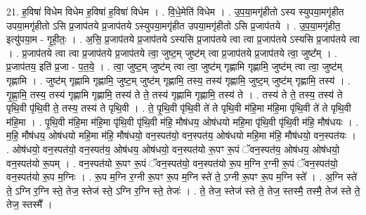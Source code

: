 \documentclass[17pt]{extarticle}
\begin{document}
21. ह॒विषा॑ विधेम विधेम ह॒विषा॑ ह॒विषा॑ विधेम । . वि॒धे॒मेति॑ विधेम । . उ॒प॒या॒मगृ॑हीतो ऽस्य स्युपया॒मगृ॑हीत उपया॒मगृ॑हीतो ऽसि प्र॒जाप॑तये प्र॒जाप॑तये ऽस्युपया॒मगृ॑हीत उपया॒मगृ॑हीतो ऽसि प्र॒जाप॑तये । . उ॒प॒या॒मगृ॑हीत॒ इत्यु॑पया॒म - गृ॒ही॒तः॒ । . अ॒सि॒ प्र॒जाप॑तये प्र॒जाप॑तये ऽस्यसि प्र॒जाप॑तये त्वा त्वा प्र॒जाप॑तये ऽस्यसि प्र॒जाप॑तये त्वा । . प्र॒जाप॑तये त्वा त्वा प्र॒जाप॑तये प्र॒जाप॑तये त्वा॒ जुष्ट॒म् जुष्ट॑म् त्वा प्र॒जाप॑तये प्र॒जाप॑तये त्वा॒ जुष्ट᳚म् । . प्र॒जाप॑तय॒ इति॑ प्र॒जा - प॒त॒ये॒ । . त्वा॒ जुष्ट॒म् जुष्ट॑म् त्वा त्वा॒ जुष्ट॑म् गृह्णामि गृह्णामि॒ जुष्ट॑म् त्वा त्वा॒ जुष्ट॑म् गृह्णामि । . जुष्ट॑म् गृह्णामि गृह्णामि॒ जुष्ट॒म् जुष्ट॑म् गृह्णामि॒ तस्य॒ तस्य॑ गृह्णामि॒ जुष्ट॒म् जुष्ट॑म् गृह्णामि॒ तस्य॑ । . गृ॒ह्णा॒मि॒ तस्य॒ तस्य॑ गृह्णामि गृह्णामि॒ तस्य॑ ते ते॒ तस्य॑ गृह्णामि गृह्णामि॒ तस्य॑ ते । . तस्य॑ ते ते॒ तस्य॒ तस्य॑ ते पृथि॒वी पृ॑थि॒वी ते॒ तस्य॒ तस्य॑ ते पृथि॒वी । . ते॒ पृ॒थि॒वी पृ॑थि॒वी ते॑ ते पृथि॒वी म॑हि॒मा म॑हि॒मा पृ॑थि॒वी ते॑ ते पृथि॒वी म॑हि॒मा । . पृ॒थि॒वी म॑हि॒मा म॑हि॒मा पृ॑थि॒वी पृ॑थि॒वी म॑हि॒ मौष॑धय॒ ओष॑धयो महि॒मा पृ॑थि॒वी पृ॑थि॒वी म॑हि॒ मौष॑धयः । . म॒हि॒ मौष॑धय॒ ओष॑धयो महि॒मा म॑हि॒ मौष॑धयो॒ वन॒स्पत॑यो॒ वन॒स्पत॑य॒ ओष॑धयो महि॒मा म॑हि॒ मौष॑धयो॒ वन॒स्पत॑यः । . ओष॑धयो॒ वन॒स्पत॑यो॒ वन॒स्पत॑य॒ ओष॑धय॒ ओष॑धयो॒ वन॒स्पत॑यो रू॒पꣳ रू॒पं ॅवन॒स्पत॑य॒ ओष॑धय॒ ओष॑धयो॒ वन॒स्पत॑यो रू॒पम् । . वन॒स्पत॑यो रू॒पꣳ रू॒पं ॅवन॒स्पत॑यो॒ वन॒स्पत॑यो रू॒प म॒ग्नि र॒ग्नी रू॒पं ॅवन॒स्पत॑यो॒ वन॒स्पत॑यो रू॒प म॒ग्निः । . रू॒प म॒ग्नि र॒ग्नी रू॒पꣳ रू॒प म॒ग्नि स्ते॑ ते॒ ऽग्नी रू॒पꣳ रू॒प म॒ग्नि स्ते᳚ । . अ॒ग्नि स्ते॑ ते॒ ऽग्नि र॒ग्नि स्ते॒ तेज॒ स्तेज॑ स्ते॒ ऽग्नि र॒ग्नि स्ते॒ तेजः॑ । . ते॒ तेज॒ स्तेज॑ स्ते ते॒ तेज॒ स्तस्मै॒ तस्मै॒ तेज॑ स्ते ते॒ तेज॒ स्तस्मै᳚ । \newline
\end{document}
